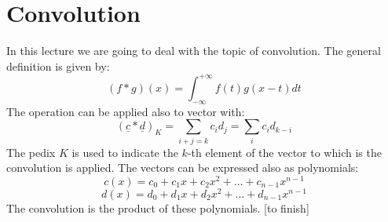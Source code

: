 \section{Convolution}
In this lecture we are going to deal with the topic of convolution. The general definition is given by:
\[
    (f*g)(x) = \int_{-\infty}^{+\infty} f(t)g(x-t)dt    
\]
The operation can be applied also to vector with:
\[
    (\underline{c}*\underline{d})_K = \sum_{i+j = k} c_i d_j = \sum_i c_i d_{k-i}    
\]
The pedix $K$ is used to indicate the $k$-th element of the vector to which is the convolution is applied. The vectors can be expressed also as polynomials:
\[
    c(x) = c_0 + c_1 x + c_2 x^2 + \dots + c_{n-1} x^{n-1}    
\]
\[
    d(x) = d_0 + d_1 x + d_2 x^2 + \dots + d_{n-1} x^{n-1}
\]
The convolution is the product of these polynomials. [to finish]


